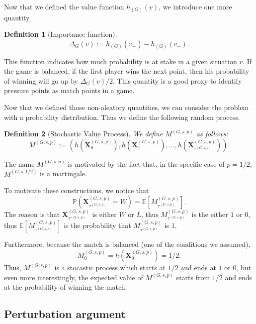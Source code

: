 \documentclass{article}
\newtheorem{definition}{Definition}
\newcommand{\win}{W}
\newcommand{\lose}{L}
\newcommand{\x}{\mathbf{X}}
\newcommand{\xgp}{\x^{\left(G, s, p\right)}}
\newcommand{\taugp}{{\tau^{\left(G, s, p\right)}}}
\newcommand{\mgp}{\m^{\left(G, s, p\right)}}
\newcommand{\m}{M}
\newcommand{\ex}{\mathbb{E}}
\newcommand{\pr}{\mathbb{P}}
\newcommand{\h}{h}
\begin{document}
Now that we defined the value function $\h_{(G)}(v)$, we introduce one more quantity
\begin{definition}[Importance function]
$$
\Delta_G(v) := \h_{(G)}(v_+) - \h_{(G)}(v_-).
$$
\end{definition}
This function indicates how much probability is at stake in a given situation $v$. If the game is balanced, if the first player wins the next point, then his probability of winning will go up by $\Delta_G(v)/2$. This quantity is a good proxy to identify pressure points as match points in a game.

Now that we defined those non-aleatory quantities, we can consider the problem with a probability distribution. Thus we define the following random process.
\begin{definition}[Stochastic Value Process]
We define $\mgp$ as follows:
$$
\mgp := \left(\h\left(\xgp_0\right), \h\left(\xgp_1\right), \dots, \h\left(\xgp_\taugp\right)\right).
$$
\end{definition}
The name $\mgp$ is motivated by the fact that, in the specific case of $p=1/2$, $\m^{(G, s, 1/2)}$ is a martingale.

To motivate these constructions, we notice that
$$
\pr\left( \xgp_\taugp = \win\right) = \ex\left[\mgp_\taugp\right].
$$
The reason is that $\xgp_\taugp$ is either $\win$ or $\lose$, thus $\mgp_\taugp$ is the either $1$ or $0$, thus $ \ex\left[\mgp_\taugp\right]$ is the probability that $\mgp_\taugp$ is $1$.

Furthermore, because the match is balanced (one of the conditions we assumed),
$$
\mgp_{0} = \h\left(\xgp_0\right) = 1/2.$$
Thus, $\mgp$ is a stocastic process which starts at $1/2$ and ends at $1$ or $0$, but even more interestingly, the expected value of $\mgp$ starts from $1/2$ and ends at the probability of winning the match.

\subsection*{Perturbation argument}
\end{document}
